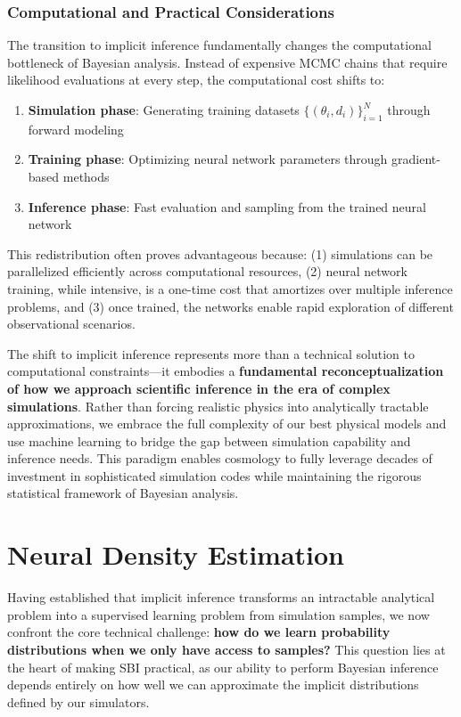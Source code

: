 \documentclass{SciPost}
\begin{document}
\subsubsection{Computational and Practical Considerations}

The transition to implicit inference fundamentally changes the computational bottleneck of Bayesian analysis. Instead of expensive MCMC chains that require likelihood evaluations at every step, the computational cost shifts to:

\begin{enumerate}
    \item \textbf{Simulation phase}: Generating training datasets $\{(\theta_i, d_i)\}_{i=1}^N$ through forward modeling
    \item \textbf{Training phase}: Optimizing neural network parameters through gradient-based methods
    \item \textbf{Inference phase}: Fast evaluation and sampling from the trained neural network
\end{enumerate}

This redistribution often proves advantageous because: (1) simulations can be parallelized efficiently across computational resources, (2) neural network training, while intensive, is a one-time cost that amortizes over multiple inference problems, and (3) once trained, the networks enable rapid exploration of different observational scenarios.

\bigskip

The shift to implicit inference represents more than a technical solution to computational constraints—it embodies a \textbf{fundamental reconceptualization of how we approach scientific inference in the era of complex simulations}. Rather than forcing realistic physics into analytically tractable approximations, we embrace the full complexity of our best physical models and use machine learning to bridge the gap between simulation capability and inference needs. This paradigm enables cosmology to fully leverage decades of investment in sophisticated simulation codes while maintaining the rigorous statistical framework of Bayesian analysis.

\section{Neural Density Estimation}

Having established that implicit inference transforms an intractable analytical problem into a supervised learning problem from simulation samples, we now confront the core technical challenge: \textbf{how do we learn probability distributions when we only have access to samples?} This question lies at the heart of making SBI practical, as our ability to perform Bayesian inference depends entirely on how well we can approximate the implicit distributions defined by our simulators.
\end{document}

